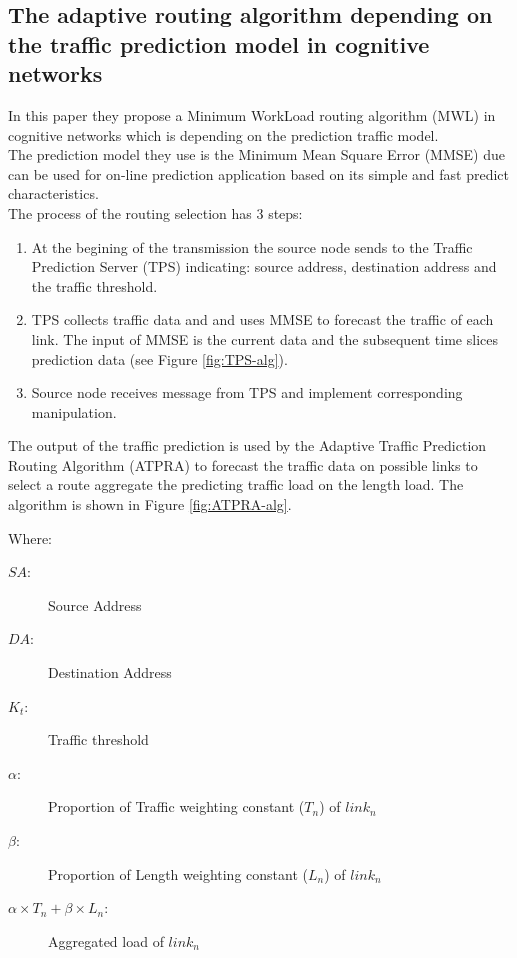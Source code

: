 \subsection{The adaptive routing algorithm depending on the traffic prediction model in cognitive networks}
\label{sec:ATPRA}

In this paper\cite{ATPRA} they propose a Minimum WorkLoad routing algorithm (MWL) in cognitive networks which is depending on the prediction traffic model.\\

The prediction model they use is the Minimum Mean Square Error (MMSE) due can be used for on-line prediction application based on its simple and fast predict characteristics. \\

The process of the routing selection has 3 steps:
\begin{enumerate}
\item At the begining of the transmission the source node sends to the Traffic Prediction Server (TPS) indicating: source address, destination address and the traffic threshold.
\item TPS collects traffic data and and uses MMSE to forecast the traffic of each link. The input of MMSE is the current data and the subsequent time slices prediction data (see Figure \ref{fig:TPS-alg}).
\item Source node receives message from TPS and implement corresponding manipulation.
\end{enumerate}


The output of the traffic prediction is used by the Adaptive Traffic Prediction Routing Algorithm (ATPRA) to forecast the traffic data on possible links to select a route aggregate the predicting traffic load on the length load. The algorithm is shown in Figure \ref{fig:ATPRA-alg}.\\  


Where:
\begin{description}
\item[$SA$:] Source Address
\item[$DA$:] Destination Address
\item[$K_{t}$:] Traffic threshold
\item[$\alpha$:] Proportion of Traffic weighting constant ($T_{n}$) of $link_{n}$  
\item[$\beta$:]  Proportion of Length weighting constant ($L_{n}$) of $link_{n}$
\item[$\alpha \times T_{n}+\beta \times L_{n}$:] Aggregated load of $link_{n}$
\end{description}

